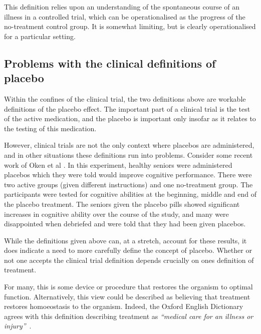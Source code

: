 This definition relies upon an understanding of the spontaneous course of an illness in a controlled trial, which can be operationalised as the progress of the no-treatment control group. It is somewhat limiting, but is clearly operationalised for a particular setting. %

\subsection{Problems with the clinical definitions of placebo}
\label{sec:plac-cogn-perf}

Within the confines of the clinical trial, the two definitions above are workable definitions of the placebo effect. The important part of a clinical trial is the test of the active medication, and the placebo is important only insofar as it relates to the testing of this medication. 

However, clinical trials are not the only context where placebos are administered, and in other situations these definitions run into problems. Consider some recent work of Oken et al \cite{Oken2008}. In this experiment, healthy seniors were administered placebos which they were told would improve cognitive performance. There were two active groups (given different instructions) and one no-treatment group. The participants were tested for cognitive abilities at the beginning, middle and end of the placebo treatment.  The seniors given the placebo pills showed significant increases in cognitive ability over the course of the study, and many were disappointed when debriefed and were told that they had been given placebos.

While the definitions given above can, at a stretch, account for these results, it does indicate a need to more carefully define the concept of placebo. Whether or not one accepts the clinical trial definition depends crucially on ones definition of treatment. 

For many, this is some device or procedure that restores the organism to optimal function. Alternatively, this view could be described as believing that treatment restores homoeostasis to the organism. Indeed, the Oxford English Dictionary agrees with this definition describing treatment as \textit{``medical care for an illness or injury''}~\cite{dictionary20101989}.


